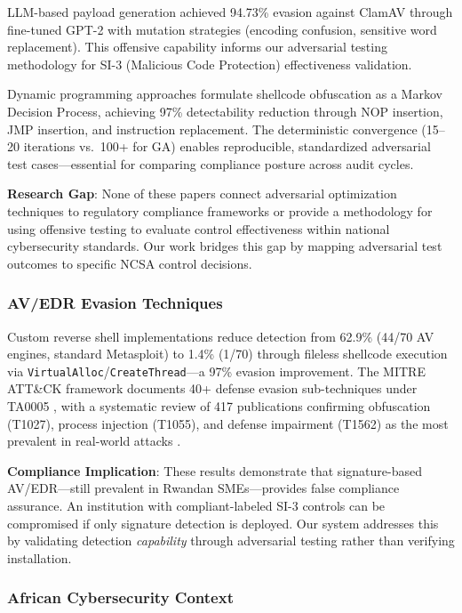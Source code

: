 \documentclass[11pt,conference]{IEEEtran}
\begin{document}
LLM-based payload generation \cite{llm_payload_paper} achieved 94.73\% evasion against ClamAV through fine-tuned GPT-2 with mutation strategies (encoding confusion, sensitive word replacement). This offensive capability informs our adversarial testing methodology for SI-3 (Malicious Code Protection) effectiveness validation.

Dynamic programming approaches \cite{dp_payload_paper} formulate shellcode obfuscation as a Markov Decision Process, achieving 97\% detectability reduction through NOP insertion, JMP insertion, and instruction replacement. The deterministic convergence (15--20 iterations vs.\ 100+ for GA) enables reproducible, standardized adversarial test cases---essential for comparing compliance posture across audit cycles.

\textbf{Research Gap}: None of these papers connect adversarial optimization techniques to regulatory compliance frameworks or provide a methodology for using offensive testing to evaluate control effectiveness within national cybersecurity standards. Our work bridges this gap by mapping adversarial test outcomes to specific NCSA control decisions.

\subsubsection{AV/EDR Evasion Techniques}

Custom reverse shell implementations \cite{reverse_shell_paper} reduce detection from 62.9\% (44/70 AV engines, standard Metasploit) to 1.4\% (1/70) through fileless shellcode execution via \texttt{VirtualAlloc}/\texttt{CreateThread}---a 97\% evasion improvement. The MITRE ATT\&CK framework documents 40+ defense evasion sub-techniques under TA0005 \cite{mitre_attack_sok}, with a systematic review of 417 publications confirming obfuscation (T1027), process injection (T1055), and defense impairment (T1562) as the most prevalent in real-world attacks \cite{mitre_attack_applications}.

\textbf{Compliance Implication}: These results demonstrate that signature-based AV/EDR---still prevalent in Rwandan SMEs---provides false compliance assurance. An institution with compliant-labeled SI-3 controls can be compromised if only signature detection is deployed. Our system addresses this by validating detection \textit{capability} through adversarial testing rather than verifying installation.

\subsubsection{African Cybersecurity Context}
\end{document}
